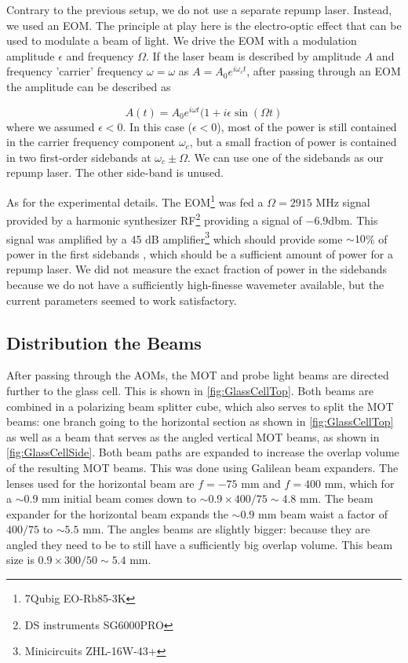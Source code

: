 Contrary to the previous setup, we do not use a separate repump laser. 
Instead, we used an \ac{EOM}.
The principle at play here is the electro-optic effect that can be used to modulate a beam of light. 
We drive the EOM with a modulation amplitude $\epsilon$ and frequency $\Omega$.
If the laser beam is described by amplitude $A$ and frequency 'carrier' frequency $\omega = \omega$ as $A = A_0 e^{i \omega_c t}$, after passing through an EOM the amplitude can be described as

\begin{equation}
    A(t) = A_0 e^{i \omega t}(1+i \epsilon \sin(\Omega t)
\end{equation}
where we assumed $\epsilon < 0$. In this case ($\epsilon <0$), most of the power is still contained in the carrier frequency component $\omega_c$, but a small fraction of power is contained in two first-order sidebands at $\omega_c \pm \Omega$.
We can use one of the sidebands as our repump laser. 
The other side-band is unused. 

As for the experimental details.
The EOM\footnote{7Qubig EO-Rb85-3K} was fed a $\Omega = 2915$ MHz signal provided by a harmonic synthesizer RF\footnote{DS instruments SG6000PRO} providing a signal of $-6.9$dbm.
This signal was amplified by a 45 dB amplifier\footnote{Minicircuits ZHL-16W-43+} which should provide some $\sim 10$\% of power in the first sidebands \cite{Rens2014}, which should be a sufficient amount of power for a repump laser. 
We did not measure the exact fraction of power in the sidebands because we do not have a sufficiently high-finesse wavemeter available, but the current parameters seemed to work satisfactory. 

\subsection{Distribution the Beams}

After passing through the AOMs, the MOT and probe light beams are directed further to the glass cell. 
This is shown in \cref{fig:GlassCellTop}.
Both beams are combined in a polarizing beam splitter cube, which also serves to split the MOT beams: one branch going to the horizontal section as shown in \cref{fig:GlassCellTop} as well as a beam that serves as the angled vertical MOT beams, as shown in \cref{fig:GlassCellSide}. 
Both beam paths are expanded to increase the overlap volume of the resulting MOT beams.
This was done using Galilean beam expanders. 
The lenses used for the horizontal beam are $f=-75$ mm and $f=400$ mm, which for a $\sim 0.9$ mm initial beam comes down to $\sim 0.9 \times 400/75 \sim 4.8$ mm.
The beam expander for the horizontal beam expands the $\sim0.9$ mm beam waist a factor of $400/75$ to $\sim5.5$ mm.
The angles beams are slightly bigger: because they are angled they need to be to still have a sufficiently big overlap volume. 
This beam size is $0.9 \times 300/50 \sim 5.4$ mm. 

